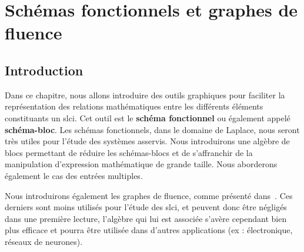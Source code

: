 \chapter[Schémas fonctionnels]
        {Schémas fonctionnels et graphes de fluence
        \label{chap-schemabloc}}
\minitoc
\newpage
\section{Introduction}
Dans ce chapitre, nous allons introduire des outils graphiques pour faciliter 
la représentation des relations mathématiques entre les différents 
éléments constituants un \gls{slci}. Cet outil est le 
\textbf{schéma fonctionnel} ou également appelé \textbf{schéma-bloc}. Les 
schémas fonctionnels, dans le domaine de Laplace, nous seront très utiles pour 
l'étude des systèmes asservis. Nous introduirons une algèbre de blocs 
permettant de réduire les schémas-blocs et de s'affranchir de la manipulation
d'expression mathématique de grande taille. Nous aborderons également le cas 
des entrées multiples. 

Nous introduirons également les graphes de fluence, comme présenté 
dans~\cite{Ostertag}. Ces derniers 
sont moins utilisés pour l'étude des \gls{slci}, et peuvent donc être négligés 
dans une première lecture, l'algèbre qui lui est associée s'avère cependant 
bien plus efficace et pourra être utilisée dans d'autres 
applications (ex : électronique, réseaux de neurones).

